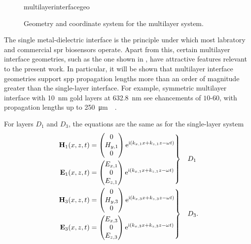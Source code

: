 \begin{figure}[ht]
\centering
{multilayerinterfacegeo}
\caption{Geometry and coordinate system for the multilayer system. }
\label{fig:multilayergeo}
\end{figure}

The single metal-dielectric interface is the principle under which most
labratory and commercial \gls{spr} biosensors operate.  Apart from this, certain
multilayer interface geometries, such as the one shown in
, have attractive features relevant to the
present work.  In particular, it will be shown that multilayer interface
geometries support \gls{spp} propagation lengths more than an order of magnitude
greater than the single-layer interface.  For example, symmetric multilayer
interface with \SI{10}{\nano\meter} gold layers at \SI{632.8}{\nano\meter}
see ehancements of $10$-$60$, with propagation lengths up to
\SI{250}{\micro\meter}~\cite{kuwamura1983experimental}~\cite{craig1983experimental}.

For layers $D_1$ and $D_3$, the equations are the same as for the single-layer system
\begin{align}
\left.\begin{aligned}
\mathbf{H}_1(x,z,t) &=
\begin{pmatrix}
0\\
H_{y,1}\\
0
\end{pmatrix} {\mathrm{e}}^{{\mathrm{i}}(k_{x,1}x+k_{z,1}z-\omega t)}\\
\mathbf{E}_1(x,z,t) &=
\begin{pmatrix}
E_{x,1}\\
0\\
E_{z,1}\\
\end{pmatrix} {\mathrm{e}}^{{\mathrm{i}}(k_{x,1}x+k_{z,1}z-\omega t)}
\end{aligned}
\right\}& \quad D_1\label{eqn:lrsppplanewavedielectric}\\
\left.\begin{aligned}
\mathbf{H}_3(x,z,t) &=
\begin{pmatrix}
0\\
H_{y,3}\\
0
\end{pmatrix}
{\mathrm{e}}^{{\mathrm{i}}(k_{x,3}x+k_{z,3}z-\omega t)}\\
\mathbf{E}_3(x,z,t) &=
\begin{pmatrix}
E_{x,3}\\
0\\
E_{z,3}\\
\end{pmatrix}
{\mathrm{e}}^{{\mathrm{i}}(k_{x,3}x+k_{z,3}z-\omega t)}
\end{aligned}
\right\}&\quad D_3.
\label{eqn:lrsppplanewavemetal}
\end{align}

